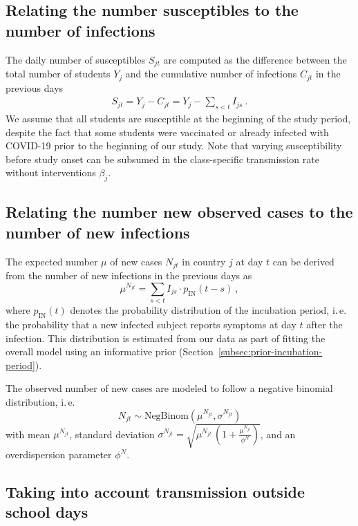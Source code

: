 \documentclass[fleqn,11pt]{wlscirep_supp}
\newcommand\ie{i.\,e.\xspace}
\begin{document}
\subsection{Relating the number susceptibles to the number of infections}

The daily number of susceptibles $S_{jt}$ are computed as the difference between the total number of students $Y_j$ and the cumulative number of infections $C_{jt}$ in the previous days
\begin{align}
    S_{jt} = Y_j - C_{jt} = Y_j - \sum_{s < t} I_{js}~.
\end{align}
We assume that all students are susceptible at the beginning of the study period, despite the fact that some students were vaccinated or already infected with COVID-19 prior to the beginning of our study. Note that varying susceptibility before study onset can be subsumed in the class-specific transmission rate without interventions $\beta_j$.

\subsection{Relating the number new observed cases to the number of new infections}

The expected number $\mu$ of new cases $N_{jt}$ in country $j$ at day $t$ can be derived from the number of new infections in the previous days as 
\begin{equation}
\mu^{N_{jt}} = \sum_{s < t} I_{js} \cdot p_\text{IN}(t-s) ~, 
\end{equation}
where $p_\text{IN}(t)$ denotes the probability distribution of the incubation period, \ie the probability that a new infected subject reports symptoms at day $t$ after the infection. This distribution is estimated from our data as part of fitting the overall model using an informative prior (Section~\ref{subsec:prior-incubation-period}).

The observed number of new cases are modeled to follow a negative binomial distribution, \ie 
\begin{equation}
N_{jt}  \sim  \textrm{NegBinom}\left(\mu^{N_{jt}}, \sigma^{N_{jt}}\right) \label{eq:N} 
\end{equation}
with mean $\mu^{N_{jt}}$, standard deviation $\sigma^{N_{jt}} = \sqrt{\mu^{N_{jt}} \, \left(1 + \frac{\mu^{N_{jt}}}{\phi^N}\right)}$, and an overdispersion parameter $\phi^N$. 


\subsection{Taking into account transmission outside school days}\label{subsec:consider-weekends}
\end{document}
